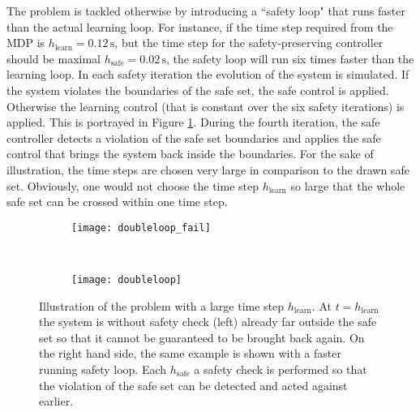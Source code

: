 \documentclass[../main.tex]{subfiles}
\begin{document}
The problem is tackled otherwise by introducing a ``safety loop" that runs faster than the actual learning loop. For instance, if the time step required from the MDP is $h_{\text{learn}} = 0.12\,\text{s}$, but the time step for the safety-preserving controller should be maximal $h_{\text{safe}} = 0.02\,\text{s}$, the safety loop will run six times faster than the learning loop. In each safety iteration the evolution of the system is simulated. If the system violates the boundaries of the safe set, the safe control is applied. Otherwise the learning control (that is constant over the six safety iterations) is applied. This is portrayed in Figure \ref{fig:doubleloop}. During the fourth iteration, the safe controller detects a violation of the safe set boundaries and applies the safe control that brings the system back inside the boundaries. For the sake of illustration, the time steps are chosen very large in comparison to the drawn safe set. Obviously, one would not choose the time step $h_{\text{learn}}$ so large that the whole safe set can be crossed within one time step.

\begin{figure}[H]
    \centering
    \begin{subfigure}[t]{0.45\textwidth}
        \texttt{[image: doubleloop\_fail]}
    \end{subfigure}%
    ~ 
    \begin{subfigure}[t]{0.55\textwidth}
        \texttt{[image: doubleloop]}
        \end{subfigure}
        \caption{Illustration of the problem with a large time step $h_{\text{learn}}$. At $t= h_{\text{learn}}$ the system is without safety check (left) already far outside the safe set so that it cannot be guaranteed to be brought back again. On the right hand side, the same example is shown with a faster running safety loop. Each $h_{\text{safe}}$ a safety check is performed so that the violation of the safe set can be detected and acted against earlier.}\label{fig:doubleloop}  
\end{figure}
\end{document}
